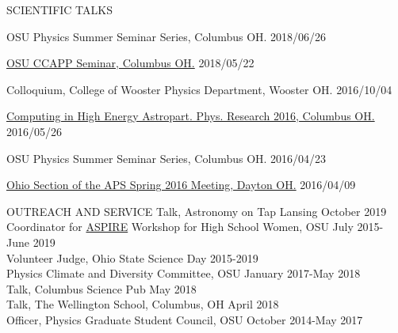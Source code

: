 \documentclass{resume} %
\begin{document}
\begin{rSection}{SCIENTIFIC TALKS}
\begin{etaremune}
\item OSU Physics Summer Seminar Series, Columbus OH. \hfill 2018/06/26

\item \href{http://ccapp.osu.edu/pastseminars.html#past}{OSU CCAPP Seminar, Columbus OH.} \hfill 2018/05/22

\item Colloquium, College of Wooster Physics Department, Wooster OH. \hfill 2016/10/04

\item \href{http://ccapp.osu.edu/workshops/CHEAPR2016/workshop.html}{Computing in High Energy Astropart. Phys. Research 2016, Columbus OH.} \hfill 2016/05/26

\item OSU Physics Summer Seminar Series, Columbus OH. \hfill 2016/04/23

\item \href{http://meetings.aps.org/Meeting/OSS16/Session/D3.6}{Ohio Section of the APS Spring 2016 Meeting, Dayton OH.} \hfill 2016/04/09
\end{etaremune}

\begin{rSection}{OUTREACH AND SERVICE}
Talk, Astronomy on Tap Lansing \hfill October 2019 \\
Coordinator for \href{u.osu.edu/aspire}{ASPIRE} Workshop for High School Women, OSU \hfill July 2015-June 2019\\
Volunteer Judge, Ohio State Science Day \hfill 2015-2019\\
Physics Climate and Diversity Committee, OSU \hfill January 2017-May 2018\\
Talk, Columbus Science Pub \hfill  May 2018\\
Talk, The Wellington School, Columbus, OH \hfill April 2018\\
Officer, Physics Graduate Student Council, OSU \hfill October 2014-May 2017 \\
\end{rSection}
\vspace{-0.30cm}
\newpage


\end{rSection}
\end{document}
